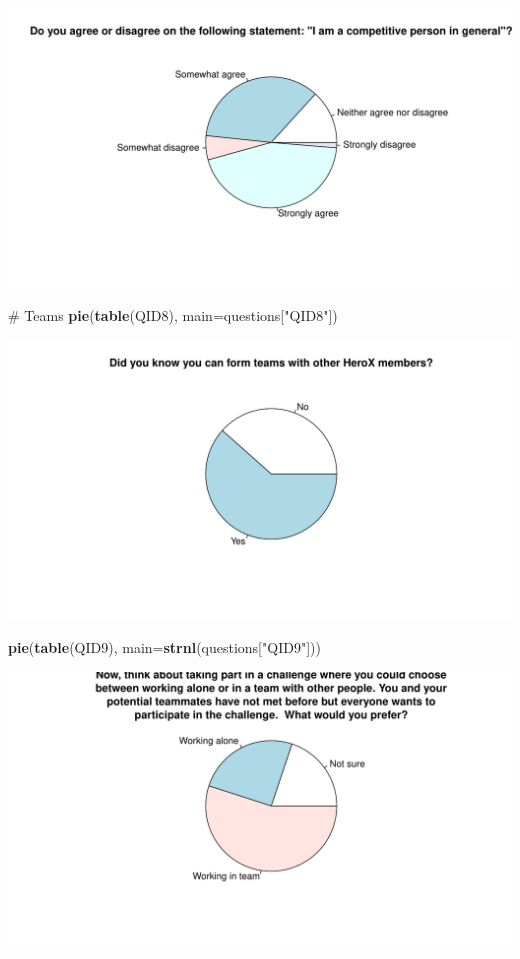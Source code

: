 \documentclass[12pt, titlepage]{article}
\newenvironment{Shaded}{\begin{snugshade}}{\end{snugshade}}
\newcommand{\KeywordTok}[1]{\textcolor[rgb]{0.12,0.11,0.11}{\textbf{#1}}}
\newcommand{\DataTypeTok}[1]{\textcolor[rgb]{0.00,0.34,0.68}{#1}}
\newcommand{\StringTok}[1]{\textcolor[rgb]{0.75,0.01,0.01}{#1}}
\newcommand{\CommentTok}[1]{\textcolor[rgb]{0.54,0.53,0.53}{#1}}
\newcommand{\NormalTok}[1]{\textcolor[rgb]{0.12,0.11,0.11}{#1}}
\begin{document}
\includegraphics{report_survey_files/figure-latex/unnamed-chunk-2-7.pdf}

\begin{Shaded}
\begin{Highlighting}[]
\CommentTok{# Teams}
\KeywordTok{pie}\NormalTok{(}\KeywordTok{table}\NormalTok{(QID8), }\DataTypeTok{main=}\NormalTok{questions[}\StringTok{"QID8"}\NormalTok{])}
\end{Highlighting}
\end{Shaded}

\includegraphics{report_survey_files/figure-latex/unnamed-chunk-2-8.pdf}

\begin{Shaded}
\begin{Highlighting}[]
\KeywordTok{pie}\NormalTok{(}\KeywordTok{table}\NormalTok{(QID9), }\DataTypeTok{main=}\KeywordTok{strnl}\NormalTok{(questions[}\StringTok{"QID9"}\NormalTok{]))}
\end{Highlighting}
\end{Shaded}

\includegraphics{report_survey_files/figure-latex/unnamed-chunk-2-9.pdf}
\end{document}
